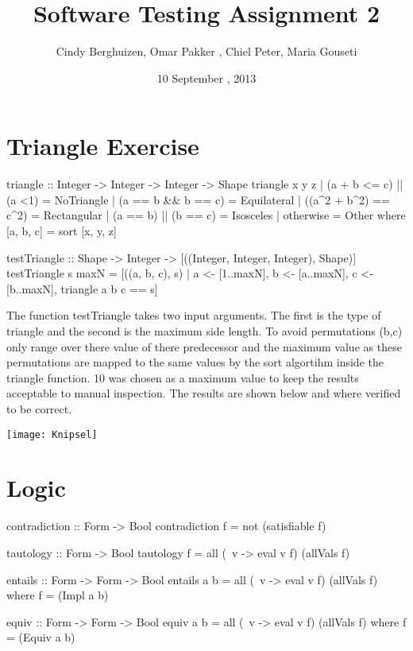 \documentclass{article}
\begin{document}
\setlength{\parindent}{0cm}

\title{Software Testing Assignment 2}
\author{Cindy Berghuizen, Omar Pakker , Chiel Peter, Maria Gouseti}
\date{10 September , 2013}
\maketitle
\section*{Triangle Exercise}
\begin{code}
triangle :: Integer -> Integer -> Integer -> Shape
triangle x y z		| (a + b <= c) || (a <1)	= NoTriangle
 			| (a == b && b == c) 		= Equilateral
 			| ((a^2 + b^2) == c^2) 		= Rectangular
 			| (a == b) || (b == c) 		= Isosceles
 			| otherwise			= Other
 			where [a, b, c] = sort [x, y, z]

testTriangle :: Shape -> Integer -> [((Integer, Integer, Integer), Shape)]
testTriangle s maxN = [((a, b, c), s)	| a <- [1..maxN], 
					  b <- [a..maxN], 
					  c <- [b..maxN], 
					  triangle a b c == s]
\end{code}

The function testTriangle takes two input arguments. The first is the type of triangle and the second is the maximum side length. To avoid permutations (b,c) only range over there value of there predecessor and the maximum value as these permutations are mapped to the same values by the sort algortihm inside the triangle function. 10 was chosen as  a maximum value to keep the results acceptable to manual inspection. The results are shown below and where verified to be correct.
\vspace{.3cm}

\texttt{[image: Knipsel]}

\section*{ Logic}

\begin{code}
contradiction :: Form -> Bool
contradiction f = not (satisfiable f)

tautology :: Form -> Bool
tautology f = all (\ v -> eval v f) (allVals f)

entails :: Form -> Form -> Bool
entails a b = all (\ v -> eval v f) (allVals f) where f = (Impl a b)

equiv :: Form -> Form -> Bool
equiv a b = all (\ v -> eval v f) (allVals f) where f = (Equiv a b)

\end{code}
\end{document}
